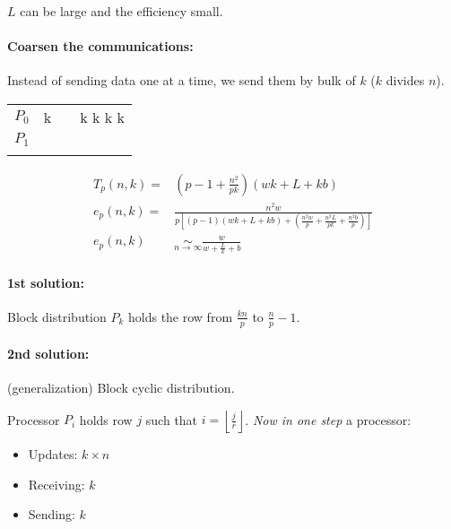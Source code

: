$L$ can be large and the efficiency small.

\paragraph{Coarsen the communications:}
Instead of sending data one at a time, we send them by bulk of $k$ ($k$ divides $n$).

\begin{center}
\begin{tabular}{c | c c c|}
\cline{2-4}
$P_0$ & \hspace{6pt} k & \vline & k \hspace{6pt} \vline \hspace{6pt} k \hspace{6pt} \vline\hspace{6pt} k \hspace{6pt}\vline\hspace{6pt} k \hspace{6pt}\\
\cline{2-4}
$P_1$ &  & \vline &\\
\cline{2-4}
 & & &\\
\cline{2-4}
\end{tabular}
\end{center}

\begin{align*}
T_p(n,k)= & \left( p-1 + \frac{n^2}{pk}\right) (wk+L+kb)\\
e_p(n,k)= & \frac{n^2w}{p[(p-1)(wk+L+kb)+(\frac{n^2w}{p}+\frac{n^2L}{pk}+\frac{n^2b}{p})]}\\
e_p(n,k) & \underset{n\to\infty}{\sim} \frac{w}{w+\frac{L}{k}+b}
\end{align*}

\paragraph{1st solution:} Block distribution
$P_k$ holds the row from $\frac{kn}{p}$ to $\frac{n}{p}-1$.

\paragraph{2nd solution:} (generalization) Block cyclic distribution.

Processor $P_i$ holds row $j$ such that $i=\left\lfloor \frac{j}{r} \right\rfloor$.
\emph{Now in one step} a processor:
\begin{itemize}
\item Updates: $k\times n$
\item Receiving: $k$
\item Sending: $k$
\end{itemize}


